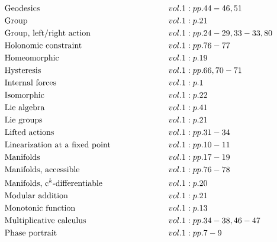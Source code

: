 \documentclass[a4paper]{article}
\begin{document}
\begin{align*}
&\text{Geodesics} \hspace*{6em}&& vol. 1: pp. 44-46, 51\\
&\text{Group} \hspace*{6em}&& vol. 1: p. 21\\
&\text{Group, left/right action} \hspace*{6em}&& vol. 1: pp. 24-29, 33-33, 80\\
&\text{Holonomic constraint} \hspace*{6em}&& vol. 1: pp. 76-77\\
&\text{Homeomorphic} \hspace*{6em}&& vol. 1: p. 19\\
&\text{Hysteresis} \hspace*{6em}&& vol. 1: pp. 66, 70-71\\
&\text{Internal forces} \hspace*{6em}&& vol. 1: p. 1\\
&\text{Isomorphic} \hspace*{6em}&& vol. 1: p. 22\\
&\text{Lie algebra} \hspace*{6em}&& vol. 1: p. 41\\
&\text{Lie groups} \hspace*{6em}&& vol. 1: p. 21\\
&\text{Lifted actions} \hspace*{6em}&& vol. 1: pp. 31-34\\
&\text{Linearization at a fixed point} \hspace*{6em}&& vol. 1: pp. 10-11\\
&\text{Manifolds} \hspace*{6em}&& vol. 1: pp. 17-19\\
&\text{Manifolds, accessible} \hspace*{6em}&& vol. 1: pp. 76-78\\
&\text{Manifolds, c$^k$-differentiable} \hspace*{6em}&& vol. 1: p. 20\\
&\text{Modular addition} \hspace*{6em}&& vol. 1: p. 21\\
&\text{Monotonic function} \hspace*{6em}&& vol. 1: p. 13\\
&\text{Multiplicative calculus} \hspace*{6em}&& vol. 1: pp. 34-38, 46-47\\
&\text{Phase portrait} \hspace*{6em}&& vol. 1: pp. 7-9\\

\end{align*}
\end{document}
